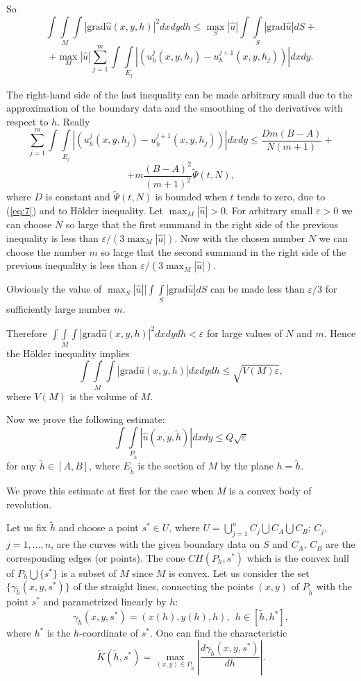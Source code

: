 \documentclass{amsart}
\begin{document}
So
$$
\int\int\limits_{M}\int |\mathrm{grad} \hat{u}(x, y, h)|^2 dx dy dh
\leq \max_{S} |\hat{u}| \int\int\limits_{S}  |\mathrm{grad} \hat{u}
|dS +
$$
$$
+\max_{M} |\hat{u}| \sum\limits_{j=1}^m  \int\int\limits_{E_j}
|(u^j_h(x,y,h_j)-u^{j+1}_h(x,y,h_j))| dx dy.
$$

The right-hand side of the last inequality  can be made arbitrary
small due to the approximation of the boundary data and the
smoothing of the derivatives with respect to $h$. Really
$$
\sum\limits_{j=1}^m  \int\int\limits_{E_j}
|(u^j_h(x,y,h_j)-u^{j+1}_h(x,y,h_j))| dx dy \leq \frac{D m(B-A)}{N
(m+1)} +
$$
$$
+ m \frac{(B-A)^2}{(m+1)^2}\tilde{\Psi}(t,N),
$$
where $D$ is constant and $\tilde{\Psi}(t,N)$ is bounded when $t$
tends to zero, due to (\ref{eq:7}) and to H\"older inequality. Let
$\max_{M} |\hat{u}|>0$. For arbitrary small $\varepsilon >0$ we can
choose $N$ so large that the first summand in the right side of the
previous inequality is less than $\varepsilon/(3 \max_{M}
|\hat{u}|)$. Now with the chosen number $N$ we can choose the number
$m$ so large that the second summand in the right side of the
previous inequality is less than $\varepsilon/(3 \max_{M}
|\hat{u}|)$.

Obviously  the value of $\max_{S} |\hat{u}| [\int\int\limits_{S}
|\mathrm{grad} \hat{u} |dS$ can be made less than $\varepsilon/3$
for sufficiently large number $m$.

Therefore $\int\int\limits_{M}\int |\mathrm{grad} \hat{u}(x, y,
h)|^2 dx dy dh < \varepsilon$ for large values of $N$ and $m$. Hence
the H\"older inequality implies
$$
\int\int\limits_{M}\int |\mathrm{grad} \hat{u}(x, y, h)|dx dy dh
\leq \sqrt{V(M) \varepsilon},
$$
where $V(M)$ is the volume of $M$.



Now we prove  the following estimate:
$$
\int\int\limits_{P_{\tilde{h}}}|\hat{u}(x,y,\tilde{h})| dx dy \leq Q
\sqrt{\varepsilon}
$$
for any $\tilde{h}\in [A,B]$, where $E_{\tilde{h}}$  is the section
of $M$ by the plane $h=\tilde{h}$.

We prove this estimate at first for the case when  $M$ is a convex
body of revolution.

Let us fix $\tilde{h}$ and choose a point $s^*\in U$, where
$U=\bigcup_{j=1}^n C_j\bigcup C_A \bigcup C_B$;  $C_j$, $j=1,...,n$,
are the curves with the given boundary data on $S$ and $C_A$, $C_B$
are the corresponding edges (or points). The cone $CH(P_h,s^*)$
which is the convex hull of $P_h \bigcup \{s^*\}$ is a subset of $M$
since $M$ is convex.  Let us consider the set $\{\gamma_{\tilde{h}}
(x,y,s^*)\}$ of the straight lines, connecting the points $(x,y)$ of
$P_{\tilde{h}}$ with the point $s^*$ and parametrized linearly by
$h$:
$$
\gamma_{\tilde{h}} (x,y,s^*)=(x(h),y(h),h), \   \  h \in
[\tilde{h},h^*],
$$
where $h^*$ is the $h$-coordinate of $s^*$.   One can find the
characteristic
$$
\tilde{K}(\tilde{h},s^*)=\max_{(x,y)\in P_{\tilde{h}}}|\frac{d
\gamma_{\tilde{h}} (x,y,s^*)}{d h}|.
$$
\end{document}
